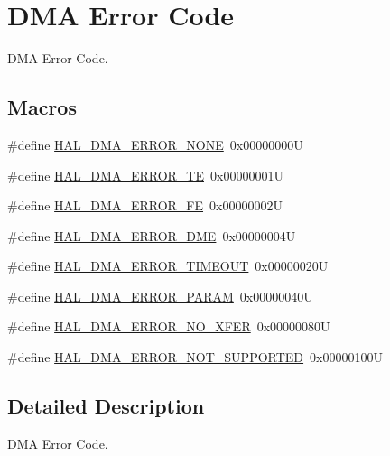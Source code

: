 \hypertarget{group___d_m_a___error___code}{}\section{D\+MA Error Code}
\label{group___d_m_a___error___code}


D\+MA Error Code.  


\subsection*{Macros}
\begin{DoxyCompactItemize}
\item 
\#define \hyperlink{group___d_m_a___error___code_gaad4009390bfbe05a1bb7115d03c25a97}{H\+A\+L\+\_\+\+D\+M\+A\+\_\+\+E\+R\+R\+O\+R\+\_\+\+N\+O\+NE}~0x00000000U
\item 
\#define \hyperlink{group___d_m_a___error___code_ga9882442c5f8f0170917934bbee1cc92d}{H\+A\+L\+\_\+\+D\+M\+A\+\_\+\+E\+R\+R\+O\+R\+\_\+\+TE}~0x00000001U
\item 
\#define \hyperlink{group___d_m_a___error___code_ga019411712b9aee1d34b57d029a461fa4}{H\+A\+L\+\_\+\+D\+M\+A\+\_\+\+E\+R\+R\+O\+R\+\_\+\+FE}~0x00000002U
\item 
\#define \hyperlink{group___d_m_a___error___code_gabac48184446aea8f467483382fc6689b}{H\+A\+L\+\_\+\+D\+M\+A\+\_\+\+E\+R\+R\+O\+R\+\_\+\+D\+ME}~0x00000004U
\item 
\#define \hyperlink{group___d_m_a___error___code_ga6cf6a5b8881ff36ed4316a29bbfb5b79}{H\+A\+L\+\_\+\+D\+M\+A\+\_\+\+E\+R\+R\+O\+R\+\_\+\+T\+I\+M\+E\+O\+UT}~0x00000020U
\item 
\#define \hyperlink{group___d_m_a___error___code_ga5aaaad3b88a77147d1e3daa3a3ad9e60}{H\+A\+L\+\_\+\+D\+M\+A\+\_\+\+E\+R\+R\+O\+R\+\_\+\+P\+A\+R\+AM}~0x00000040U
\item 
\#define \hyperlink{group___d_m_a___error___code_gab7526e686427f26bf3b6af062d5a690b}{H\+A\+L\+\_\+\+D\+M\+A\+\_\+\+E\+R\+R\+O\+R\+\_\+\+N\+O\+\_\+\+X\+F\+ER}~0x00000080U
\item 
\#define \hyperlink{group___d_m_a___error___code_ga7432f31f9972e1c0a398a3f20587d118}{H\+A\+L\+\_\+\+D\+M\+A\+\_\+\+E\+R\+R\+O\+R\+\_\+\+N\+O\+T\+\_\+\+S\+U\+P\+P\+O\+R\+T\+ED}~0x00000100U
\end{DoxyCompactItemize}


\subsection{Detailed Description}
D\+MA Error Code. 



